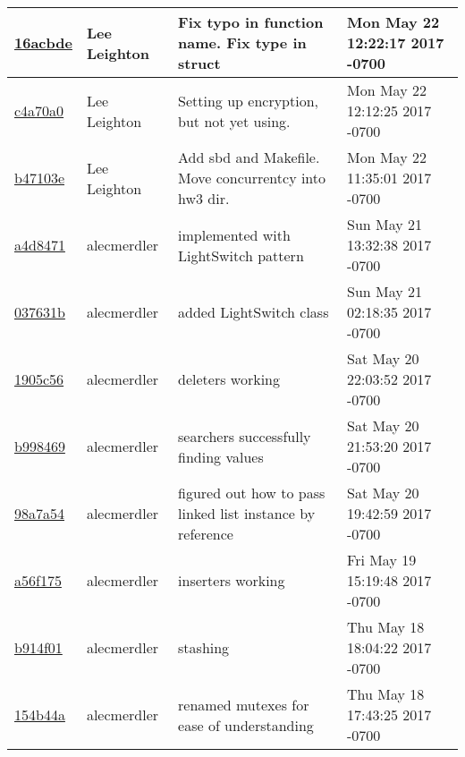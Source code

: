 \begin{tabular}{l l l l}
\href{https://github.com/alecmerdler/cs-444-group-119/commit/16acbde0f356cd3094ceac400a542ec2af2e2504}{16acbde} & Lee Leighton & Fix typo in function name. Fix type in struct & Mon May 22 12:22:17 2017 -0700\\\hline
\href{https://github.com/alecmerdler/cs-444-group-119/commit/c4a70a03960d0f45fd8e48b44bf6130091e49b23}{c4a70a0} & Lee Leighton & Setting up encryption, but not yet using. & Mon May 22 12:12:25 2017 -0700\\\hline
\href{https://github.com/alecmerdler/cs-444-group-119/commit/b47103eae18f8b74720f2bc8314e316d10f499fd}{b47103e} & Lee Leighton & Add sbd and Makefile. Move concurrentcy into hw3 dir. & Mon May 22 11:35:01 2017 -0700\\\hline
\href{https://github.com/alecmerdler/cs-444-group-119/commit/a4d8471b00b39d4a3ec09b301115d729bd457e45}{a4d8471} & alecmerdler & implemented with LightSwitch pattern & Sun May 21 13:32:38 2017 -0700\\\hline
\href{https://github.com/alecmerdler/cs-444-group-119/commit/037631b1e84e2f6ede48af92c8614ebad3ae7a4b}{037631b} & alecmerdler & added LightSwitch class & Sun May 21 02:18:35 2017 -0700\\\hline
\href{https://github.com/alecmerdler/cs-444-group-119/commit/1905c56c31be38dd846beec3c3fdb64f8422b3dc}{1905c56} & alecmerdler & deleters working & Sat May 20 22:03:52 2017 -0700\\\hline
\href{https://github.com/alecmerdler/cs-444-group-119/commit/b998469fd053a258a927eb707c2ab21a3e5fbc8e}{b998469} & alecmerdler & searchers successfully finding values & Sat May 20 21:53:20 2017 -0700\\\hline
\href{https://github.com/alecmerdler/cs-444-group-119/commit/98a7a54e6ad300bb0aa2091a752058fd9c108644}{98a7a54} & alecmerdler & figured out how to pass linked list instance by reference & Sat May 20 19:42:59 2017 -0700\\\hline
\href{https://github.com/alecmerdler/cs-444-group-119/commit/a56f175ef76e23fe5bd5bc18e80d0035b232c3e7}{a56f175} & alecmerdler & inserters working & Fri May 19 15:19:48 2017 -0700\\\hline
\href{https://github.com/alecmerdler/cs-444-group-119/commit/b914f01b2e1e4067dae21c9038ad410339656616}{b914f01} & alecmerdler & stashing & Thu May 18 18:04:22 2017 -0700\\\hline
\href{https://github.com/alecmerdler/cs-444-group-119/commit/154b44ad7641fb70692d934a20edefc35e591095}{154b44a} & alecmerdler & renamed mutexes for ease of understanding & Thu May 18 17:43:25 2017 -0700\\\hline

\end{tabular}

